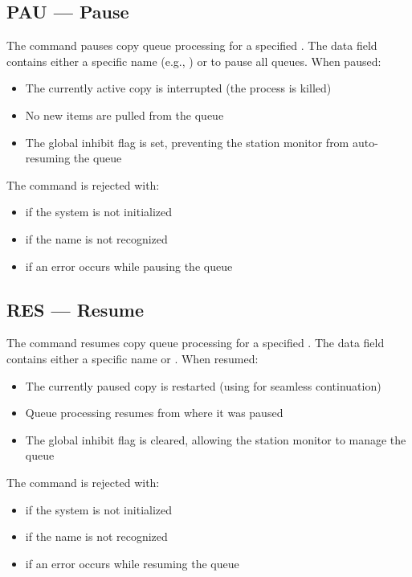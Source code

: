 \subsection{PAU --- Pause}

The  command pauses copy queue processing for a specified \DR{}. The data field contains either a specific \DR{} name (e.g., ) or  to pause all queues. When paused:

\begin{itemize}
    \item The currently active copy is interrupted (the  process is killed)
    \item No new items are pulled from the queue
    \item The global inhibit flag is set, preventing the station monitor from auto-resuming the queue
\end{itemize}

The command is rejected with:
\begin{itemize}
    \item {} if the system is not initialized
    \item {} if the \DR{} name is not recognized
    \item {} if an error occurs while pausing the queue
\end{itemize}

\subsection{RES --- Resume}

The  command resumes copy queue processing for a specified \DR{}. The data field contains either a specific \DR{} name or . When resumed:

\begin{itemize}
    \item The currently paused copy is restarted (using  for seamless continuation)
    \item Queue processing resumes from where it was paused
    \item The global inhibit flag is cleared, allowing the station monitor to manage the queue
\end{itemize}

The command is rejected with:
\begin{itemize}
    \item {} if the system is not initialized
    \item {} if the \DR{} name is not recognized
    \item {} if an error occurs while resuming the queue
\end{itemize}


